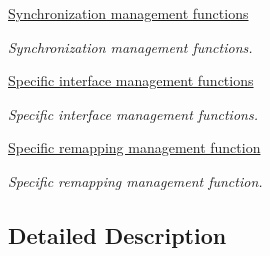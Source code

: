 \begin{DoxyCompactItemize}
\hyperlink{group___t_i_m___group7}{Synchronization management functions}
\begin{DoxyCompactList}\small\item\em Synchronization management functions. \end{DoxyCompactList}\item 
\hyperlink{group___t_i_m___group8}{Specific interface management functions}
\begin{DoxyCompactList}\small\item\em Specific interface management functions. \end{DoxyCompactList}\item 
\hyperlink{group___t_i_m___group9}{Specific remapping management function}
\begin{DoxyCompactList}\small\item\em Specific remapping management function. \end{DoxyCompactList}\end{DoxyCompactItemize}


\subsection{Detailed Description}
